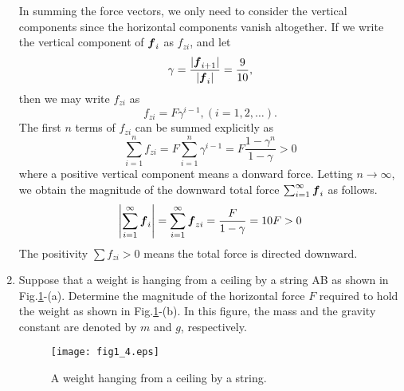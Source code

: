 \documentclass[10pt,a4j]{article}
\begin{document}
\begin{enumerate}
    {\small 
     In summing the force vectors, we only need to consider the vertical components since the horizontal components vanish altogether. If we write the vertical component of $\mbox{\boldmath $f$}_i$ as $f_{zi}$, and let 
        \[
            \gamma=\frac{|\mbox{\boldmath $f$}_{i+1}|}{|\mbox{\boldmath $f$}_i|}=\frac{9}{10},
        \]
        then we may write $f_{zi}$ as 
        \[
            f_{zi}=F\gamma^{i-1}, (i=1,2,\dots).
        \]
  The first $n$ terms of $f_{zi}$ can be summed explicitly as  
        \[
            \sum_{i=1}^n f_{zi}=F\sum_{i=1}^n\gamma^{i-1}=F\frac{1-\gamma^n}{1-\gamma} >0
        \]
        where a positive vertical component means a donward force.
        Letting $n\rightarrow \infty$, we obtain the magnitude of the downward total force 
	$\sum_{i=1}^\infty \mbox{\boldmath $f$}_i$ 
        as follows. 
        \[
            \left| \sum_{i=1}^\infty \mbox{\boldmath $f$}_i \right| =
	    \sum_{i=1}^\infty \mbox{\boldmath $f$}_{zi}=
	    \frac{F}{1-\gamma}=10F >0
        \]
	The positivity $\sum f_{zi}>0$ means the total force is directed downward. 
    }
\item
    Suppose that a weight is hanging from a ceiling by a string AB as shown in Fig.\ref{fig:fig1_4}-(a). 
    Determine the magnitude of the horizontal force $F$ required to hold the weight as shown 
    in Fig.\ref{fig:fig1_4}-(b). In this figure, the mass and the gravity constant are denoted 
    by $m$ and $g$, respectively. \\
    \begin{figure}[h]
    \begin{center}
    \texttt{[image: fig1\_4.eps]} 
    \end{center}
    \caption{A weight hanging from a ceiling by a string.} 
    \label{fig:fig1_4}
    \end{figure}


\end{enumerate}
\end{document}
